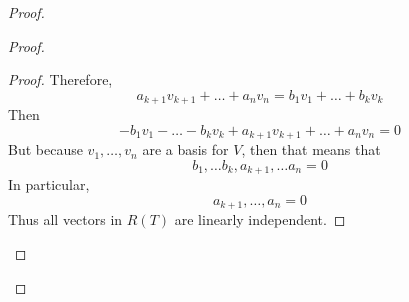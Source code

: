 \documentclass{article}
\newtheorem{one minute paper}[theorem]{One Minute Paper}
\begin{document}
\begin{proof}
\begin{proof}
\begin{proof}
            Therefore, 
            \begin{equation}
                a_{k+1}v_{k+1} + \dots + a_nv_n = b_1v_1 + \dots + b_kv_k
            \end{equation}
            Then 
            \begin{equation}
                -b_1v_1 - \dots - b_kv_k + a_{k+1}v_{k+1} + \dots + a_nv_n = 0
            \end{equation}
            But because $v_1, \dots, v_n$ are a basis for $V$, then that means that 
            \begin{equation}
                b_1,\dots b_k, a_{k+1}, \dots a_n = 0
            \end{equation}
            In particular, 
            \begin{equation}
                a_{k+1}, \dots, a_n = 0
            \end{equation}
            Thus all vectors in $R(T)$ are linearly independent. 
        \end{proof}
    \end{proof}
\end{proof}
\end{document}
